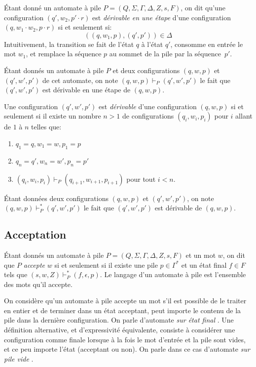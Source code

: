 Étant donné un automate à pile $P = (Q, \Sigma, \Gamma, \Delta, Z, s, F)$, on dit qu'une configuration $(q', w_2, p' \cdot r)$ est \og \textit{dérivable en une étape} \fg{} d'une configuration $(q, w_1 \cdot w_2, p \cdot r)$ si et seulement si:
\[
((q, w_1, p), (q', p')) \in \Delta
\]
Intuitivement, la transition se fait de l'état $q$ à l'état $q'$, consomme en entrée le mot $w_1$, et remplace la séquence $p$ au sommet de la pile par la séquence~$p'$.

Étant donnés un automate à pile $P$ et deux configurations $(q, w, p)$ et $(q', w', p')$ de cet automate, on note $(q, w, p) \vdash_P (q', w', p')$ le fait que $(q', w', p')$ est dérivable en une étape de $(q, w, p)$.

Une configuration $(q', w', p')$ est \og \textit{dérivable} \fg{} d'une configuration $(q, w, p)$ si et seulement si il existe un nombre $n > 1$ de configurations $(q_i, w_i, p_i)$ pour $i$ allant de $1$ à $n$ telles que:
\begin{enumerate}
\item $q_1 = q, w_1 = w, p_1 = p$
\item $q_n = q', w_n = w', p_n = p'$
\item $(q_i, w_i, p_i) \vdash_P (q_{i+1}, w_{i+1}, p_{i+1})$ pour tout $i < n$.
\end{enumerate}
Étant données deux configurations $(q, w, p)$ et $(q', w', p')$, on note $(q, w, p) \vdash_P^* (q', w', p')$ le fait que $(q', w', p')$ est dérivable de $(q, w, p)$.

\subsection{Acceptation}

Étant donnés un automate à pile $P = (Q, \Sigma, \Gamma, \Delta, Z, s, F)$ et un mot $w$, on dit que $P$ \og \textit{accepte} \fg{} $w$ si et seulement si il existe une pile $p \in \Gamma^*$ et un état final $f \in F$ tels que $(s, w, Z) \vdash_P^* (f, \epsilon, p)$.
Le langage d'un automate à pile est l'ensemble des mots qu'il accepte.

On considère qu'un automate à pile accepte un mot s'il est possible de le traiter en entier et de terminer dans un état acceptant, peut importe le contenu de la pile dans la dernière configuration.
On parle d'automate \og \textit{sur état final} \fg{}. Une définition alternative, et d'expressivité équivalente, consiste à considérer une configuration comme finale lorsque à la fois le mot d'entrée et la pile sont vides, et ce peu importe l'état (acceptant ou non).
On parle dans ce cas d'automate \og \textit{sur pile vide} \fg{}.

